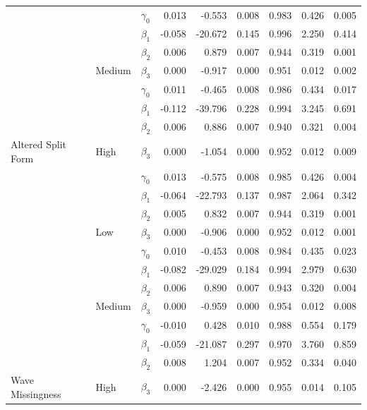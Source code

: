 \documentclass{svjour3}\usepackage[]{graphicx}\usepackage[]{color}
\newenvironment{knitrout}{}{} %
\begin{document}
\begin{knitrout}
\begin{table}[!h]
{\begin{tabular}[t]{l|l|l|r|r|r|r|r|r}
\cline{2-9}
 &  & $\gamma_0$ & 0.013 & -0.553 & 0.008 & 0.983 & 0.426 & 0.005\\
\cline{3-9}
 &  & $\beta_1$ & -0.058 & -20.672 & 0.145 & 0.996 & 2.250 & 0.414\\
\cline{3-9}
 &  & $\beta_2$ & 0.006 & 0.879 & 0.007 & 0.944 & 0.319 & 0.001\\
\cline{3-9}
 & \multirow{-4}{*}{\raggedright\arraybackslash Medium} & $\beta_3$ & 0.000 & -0.917 & 0.000 & 0.951 & 0.012 & 0.002\\
\cline{2-9}
 &  & $\gamma_0$ & 0.011 & -0.465 & 0.008 & 0.986 & 0.434 & 0.017\\
\cline{3-9}
 &  & $\beta_1$ & -0.112 & -39.796 & 0.228 & 0.994 & 3.245 & 0.691\\
\cline{3-9}
 &  & $\beta_2$ & 0.006 & 0.886 & 0.007 & 0.940 & 0.321 & 0.004\\
\cline{3-9}
\multirow{-12}{*}{\raggedright\arraybackslash Altered Split Form} & \multirow{-4}{*}{\raggedright\arraybackslash High} & $\beta_3$ & 0.000 & -1.054 & 0.000 & 0.952 & 0.012 & 0.009\\
\cline{1-9}
 &  & $\gamma_0$ & 0.013 & -0.575 & 0.008 & 0.985 & 0.426 & 0.004\\
\cline{3-9}
 &  & $\beta_1$ & -0.064 & -22.793 & 0.137 & 0.987 & 2.064 & 0.342\\
\cline{3-9}
 &  & $\beta_2$ & 0.005 & 0.832 & 0.007 & 0.944 & 0.319 & 0.001\\
\cline{3-9}
 & \multirow{-4}{*}{\raggedright\arraybackslash Low} & $\beta_3$ & 0.000 & -0.906 & 0.000 & 0.952 & 0.012 & 0.001\\
\cline{2-9}
 &  & $\gamma_0$ & 0.010 & -0.453 & 0.008 & 0.984 & 0.435 & 0.023\\
\cline{3-9}
 &  & $\beta_1$ & -0.082 & -29.029 & 0.184 & 0.994 & 2.979 & 0.630\\
\cline{3-9}
 &  & $\beta_2$ & 0.006 & 0.890 & 0.007 & 0.943 & 0.320 & 0.004\\
\cline{3-9}
 & \multirow{-4}{*}{\raggedright\arraybackslash Medium} & $\beta_3$ & 0.000 & -0.959 & 0.000 & 0.954 & 0.012 & 0.008\\
\cline{2-9}
 &  & $\gamma_0$ & -0.010 & 0.428 & 0.010 & 0.988 & 0.554 & 0.179\\
\cline{3-9}
 &  & $\beta_1$ & -0.059 & -21.087 & 0.297 & 0.970 & 3.760 & 0.859\\
\cline{3-9}
 &  & $\beta_2$ & 0.008 & 1.204 & 0.007 & 0.952 & 0.334 & 0.040\\
\cline{3-9}
\multirow{-12}{*}{\raggedright\arraybackslash Wave Missingness} & \multirow{-4}{*}{\raggedright\arraybackslash High} & $\beta_3$ & 0.000 & -2.426 & 0.000 & 0.955 & 0.014 & 0.105\\
\hline
\end{tabular}}
\end{table}


\end{knitrout}
\end{document}
